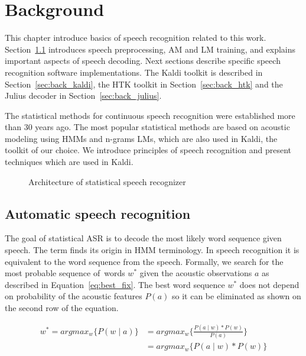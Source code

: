 \chapter{Background}
\label{cha:background}
This chapter introduce basics of speech recognition related to this work.
Section~\ref{sec:back_asr} introduces speech preprocessing, \acf{AM} and \acf{LM} training, and explains important aspects of speech decoding.
Next sections describe specific speech recognition software implementations.
The Kaldi toolkit is described in Section~\ref{sec:back_kaldi}, the \ac{HTK} toolkit in Section~\ref{sec:back_htk} and the Julius decoder in Section~\ref{sec:back_julius}.

The statistical methods for continuous speech recognition were established more than 30 years ago. 
The most popular statistical methods are based on acoustic modeling using \acp{HMM} and n-grams \acp{LM}, which are also used in Kaldi, the toolkit of our choice.
We introduce principles of speech recognition and present techniques which are used in Kaldi. 

\begin{figure}[!htp]
    \begin{center}
    
    \caption{Architecture of statistical speech recognizer\cite{ney1990acoustic}}
    \label{fig:components} 
    \end{center}
\end{figure}

\section{Automatic speech recognition}
\label{sec:back_asr}

The goal of statistical \ac{ASR} is to decode the most likely word sequence given speech.
The term  finds its origin in \acs{HMM} terminology. 
In speech recognition it is equivalent to  the word sequence from the speech. 
Formally, we search for the most probable sequence of~words $w^*$ given the acoustic observations $a$ as described in Equation~\ref{eq:best_fix}.
The best word sequence $w^*$ does not depend on probability of the acoustic features $P(a)$ so it can be eliminated as shown on the second row of the equation.

\begin{equation}\label{eq:best_fix}
    \begin{split}
    w^* = argmax_{w}\{P(w \mid a)\} &= argmax_{w}\{\frac{P(a \mid w) * P(w)}{P(a)}\} \\
                                    &= argmax_{w}\{P(a \mid w) * P(w)\}
    \end{split}
\end{equation}

